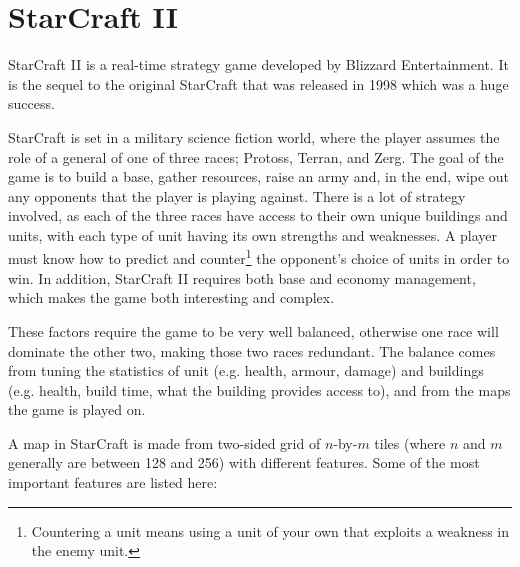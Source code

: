 \section{StarCraft II}
\label{introduction_starcraft}

StarCraft II\cite{starcraft2} is a real-time strategy game developed by Blizzard Entertainment. It is the sequel to the original StarCraft\cite{starcraft} that was released in 1998 which was a huge success.

StarCraft is set in a military science fiction world, where the player assumes the role of a general of one of three races; Protoss, Terran, and Zerg. The goal of the game is to build a base, gather resources, raise an army and, in the end, wipe out any opponents that the player is playing against. There is a lot of strategy involved, as each of the three races have access to their own unique buildings and units, with each type of unit having its own strengths and weaknesses. A player must know how to predict and counter\footnote{Countering a unit means using a unit of your own that exploits a weakness in the enemy unit.} the opponent's choice of units in order to win. In addition, StarCraft II requires both base and economy management, which makes the game both interesting and complex.


These factors require the game to be very well balanced, otherwise one race will dominate the other two, making those two races redundant. The balance comes from tuning the statistics of unit (e.g. health, armour, damage) and buildings (e.g. health, build time, what the building provides access to), and from the maps the game is played on.

A map in StarCraft is made from two-sided grid of $n$-by-$m$ tiles (where $n$ and $m$ generally are between 128 and 256) with different features. Some of the most important features are listed here:

